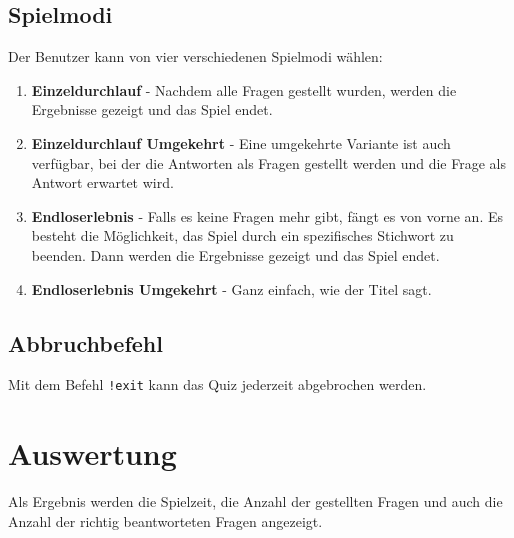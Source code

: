 \documentclass{article}
\begin{document}
\subsection{Spielmodi}
Der Benutzer kann von vier verschiedenen Spielmodi wählen:
\begin{enumerate}
    \item \textbf{Einzeldurchlauf} - Nachdem alle Fragen gestellt wurden, werden die Ergebnisse gezeigt und das Spiel endet.
    \item \textbf{Einzeldurchlauf Umgekehrt} - Eine umgekehrte Variante ist auch verfügbar, bei der die Antworten als Fragen gestellt werden und die Frage als Antwort erwartet wird.
    \item \textbf{Endloserlebnis} - Falls es keine Fragen mehr gibt, fängt es von vorne an. Es besteht die Möglichkeit, das Spiel durch ein spezifisches Stichwort zu beenden. Dann werden die Ergebnisse gezeigt und das Spiel endet.
    \item \textbf{Endloserlebnis Umgekehrt} - Ganz einfach, wie der Titel sagt.
\end{enumerate}

\subsection{Abbruchbefehl}
Mit dem Befehl \texttt{!exit} kann das Quiz jederzeit abgebrochen werden.

\section{Auswertung}
Als Ergebnis werden die Spielzeit, die Anzahl der gestellten Fragen und auch die Anzahl der richtig beantworteten Fragen angezeigt.
\end{document}
